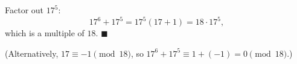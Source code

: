 Factor out $17^5$:
\[
17^6+17^5=17^5(17+1)=18\cdot17^5,
\]
which is a multiple of $18$. $\blacksquare$

(Alternatively, $17\equiv-1\pmod{18}$, so $17^6+17^5\equiv1+(-1)=0\pmod{18}$.)
